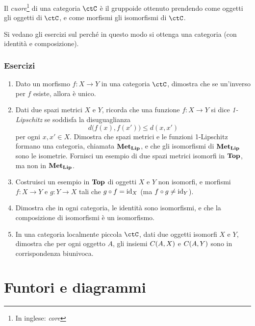 \begin{definition} 
 Il \emph{cuore}\footnote{In inglese: \emph{core}} di una categoria $\ctC$ è il gruppoide ottenuto prendendo come oggetti gli oggetti di $\ctC$, e come morfismi gli isomorfismi di $\ctC$. 
\end{definition}

Si vedano gli esercizi sul perché in questo modo si ottenga una categoria (con identità e composizione). 


\subsubsection*{Esercizi}
\begin{enumerate}
    \item Dato un morfismo $f:X\to Y$ in una categoria $\ctC$, dimostra che se un'inverso per $f$ esiste, allora è unico.
    \item Dati due spazi metrici $X$ e $Y$, ricorda che una funzione $f:X\to Y$ si dice \emph{1-Lipschitz} se soddisfa la disuguaglianza
    \[
     d\big( f(x), f(x') \big) \le d(x,x')
    \]
    per ogni $x,x'\in X$. Dimostra che spazi metrici e le funzioni 1-Lipschitz formano una categoria, chiamata $\mathbf{Met}_{\mathbf{Lip}}$, e che gli isomorfismi di $\mathbf{Met}_{\mathbf{Lip}}$ sono le isometrie. Fornisci un esempio di due spazi metrici isomorfi in $\mathbf{Top}$, ma non in $\mathbf{Met}_{\mathbf{Lip}}$.
    \item Costruisci un esempio in $\mathbf{Top}$ di oggetti $X$ e $Y$ non isomorfi, e morfismi $f:X\to Y$ e $g:Y\to X$ tali che $g\circ f=\mathrm{id}_X$ (ma $f\circ g \ne \mathrm{id}_Y$). 
    \item Dimostra che in ogni categoria, le identità sono isomorfismi, e che la composizione di isomorfismi è un isomorfismo. 
    \item In una categoria localmente piccola $\ctC$, dati due oggetti isomorfi $X$ e $Y$, dimostra che per ogni oggetto $A$, gli insiemi $C(A,X)$ e $C(A,Y)$ sono in corrispondenza biunivoca.
\end{enumerate}


\section{Funtori e diagrammi}


